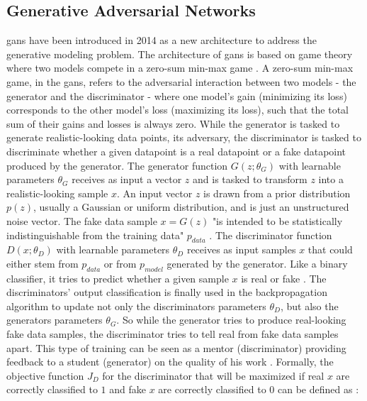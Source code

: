 \subsection{Generative Adversarial Networks}
\label{ch:preliminaries-generativeAdversarialNetworks}

\Glspl{gan} \cite{NIPS2014_5ca3e9b1} have been introduced in 2014 as a new architecture to address the generative modeling problem.
The architecture of \glspl{gan} is based on game theory where two models compete in a zero-sum min-max game \cite{NIPS2014_5ca3e9b1, zhao2022CTABGANEnhancingTabular}.
A zero-sum min-max game, in the \glspl{gan}, refers to the adversarial interaction between two models - the generator and the discriminator - where one model's gain (minimizing its loss) corresponds to the other model's loss (maximizing its loss), such that the total sum of their gains and losses is always zero.
While the generator is tasked to generate realistic-looking data points, its adversary, the discriminator is tasked to discriminate whether a given datapoint is a real datapoint or a fake datapoint produced by the generator.
The generator function $G(z;\theta_G)$ with learnable parameters $\theta_G$ receives as input a vector $z$ and is tasked to transform $z$ into a realistic-looking sample $x$.
An input vector $z$ is drawn from a prior distribution $p(z)$, usually a Gaussian or uniform distribution, and is just an unstructured noise vector.
The fake data sample $x=G(z)$ "is intended to be statistically indistinguishable from the training data" $p_{data}$ \cite[p. 141]{goodfellow2020GenerativeAdversarialNetworks}.
The discriminator function $D(x;\theta_D)$ with learnable parameters $\theta_D$ receives as input samples $x$ that could either stem from $p_{data}$ or from $p_{model}$ generated by the generator.
Like a binary classifier, it tries to predict whether a given sample $x$ is real or fake \cite{NIPS2014_5ca3e9b1}.
The discriminators' output classification is finally used in the backpropagation algorithm to update not only the discriminators parameters $\theta_D$, but also the generators parameters $\theta_G$.
So while the generator tries to produce real-looking fake data samples, the discriminator tries to tell real from fake data samples apart. 
This type of training can be seen as a mentor (discriminator) providing feedback to a student (generator) on the quality of his work \cite{zhao2022CTABGANEnhancingTabular}.
Formally, the objective function $J_D$ for the discriminator that will be maximized if real $x$ are correctly classified to $1$ and fake $x$ are correctly classified to $0$ can be defined as \cite{aggarwal2018NeuralNetworksDeep}:


